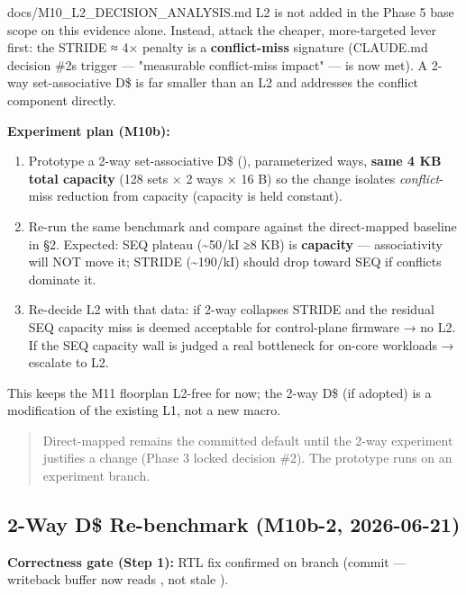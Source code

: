 \begin{relocated}{docs/M10_L2_DECISION_ANALYSIS.md}
L2 is not added in the Phase 5 base scope on this evidence alone.
Instead, attack the cheaper, more-targeted lever first: the STRIDE ≈ 4×
penalty is a \textbf{conflict-miss} signature (CLAUDE.md decision
\#2\textquotesingle s trigger --- "measurable conflict-miss impact" ---
is now met). A 2-way set-associative D\$ is far smaller than an L2 and
addresses the conflict component directly.

\textbf{Experiment plan (M10b):}

\begin{enumerate}
\def\labelenumi{\arabic{enumi}.}
\tightlist
\item
  Prototype a 2-way set-associative D\$ (),
  parameterized ways, \textbf{same 4 KB total capacity} (128 sets × 2
  ways × 16 B) so the change isolates \emph{conflict}-miss reduction
  from capacity (capacity is held constant).
\item
  Re-run the same  benchmark and compare against the
  direct-mapped baseline in §2. Expected: SEQ plateau
  (\textasciitilde50/kI ≥8 KB) is \textbf{capacity} --- associativity
  will NOT move it; STRIDE (\textasciitilde190/kI) should drop toward
  SEQ if conflicts dominate it.
\item
  Re-decide L2 with that data: if 2-way collapses STRIDE and the
  residual SEQ capacity miss is deemed acceptable for control-plane
  firmware → no L2. If the SEQ capacity wall is judged a real bottleneck
  for on-core workloads → escalate to L2.
\end{enumerate}

This keeps the M11 floorplan L2-free for now; the 2-way D\$ (if adopted)
is a modification of the existing L1, not a new macro.

\begin{quote}
Direct-mapped remains the committed default until the 2-way experiment
justifies a change (Phase 3 locked decision \#2). The prototype runs on
an experiment branch.
\end{quote}

\subsection{2-Way D\$ Re-benchmark (M10b-2, 2026-06-21)}\label{tm:dec:m10-l2:5-2-way-d-re-benchmark-m10b-2-2026-06-21}

\textbf{Correctness gate (Step 1):} RTL fix
 confirmed on branch
 (commit  --- writeback
buffer now reads , not stale ).


\end{relocated}
